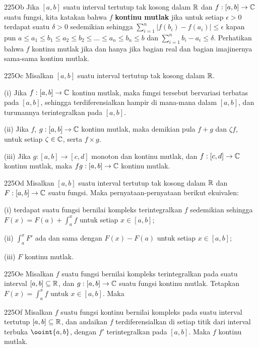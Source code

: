 \spheader 225Ob Jika $[a,b]$ suatu interval tertutup
tak kosong dalam $\Bbb R$ dan $f:[a,b]\to\Bbb C$ suatu fungsi, kita katakan
bahwa $f$ {\bf kontinu mutlak} jika untuk setiap $\epsilon>0$ terdapat
suatu $\delta>0$ sedemikian sehingga $\sum_{i=1}^n|f(b_i)-f(a_i)|\le\epsilon$
kapan pun $a\le a_1\le b_1\le a_2\le b_2\le\ldots\le a_n\le b_n\le b$ dan
$\sum_{i=1}^nb_i-a_i\le\delta$. Perhatikan bahwa $f$ kontinu
mutlak jika dan hanya jika bagian real dan bagian imajinernya sama-sama
kontinu mutlak.

\spheader 225Oc Misalkan $[a,b]$ suatu interval tertutup tak kosong dalam
$\Bbb R$.

\quad(i) Jika $f:[a,b]\to\Bbb C$ kontinu mutlak, maka fungsi tersebut bervariasi
terbatas pada $[a,b]$, sehingga terdiferensialkan hampir di mana-mana dalam $[a,b]$,
dan turunannya terintegralkan pada $[a,b]$.

\quad(ii) Jika $f$, $g:[a,b]\to\Bbb C$ kontinu mutlak, maka demikian pula
$f+g$ dan $\zeta f$, untuk setiap $\zeta\in\Bbb C$, serta $f\times g$.

\quad(iii) Jika $g:[a,b]\to[c,d]$ monoton dan kontinu mutlak,
dan
$f:[c,d]\to\Bbb C$ kontinu mutlak, maka $fg:[a,b]\to\Bbb C$
kontinu mutlak.

\spheader 225Od Misalkan $[a,b]$ suatu interval tertutup tak kosong dalam
$\Bbb R$ dan $F:[a,b]\to\Bbb C$ suatu fungsi. Maka pernyataan-pernyataan berikut
ekuivalen:

\quad(i) terdapat suatu fungsi bernilai kompleks terintegralkan $f$ sedemikian sehingga
$F(x)=F(a)+\int_a^xf$ untuk setiap $x\in[a,b]$;

\quad(ii) $\int_a^xF'$ ada dan sama dengan
$F(x)-F(a)$ untuk setiap $x\in[a,b]$;

\quad(iii) $F$ kontinu mutlak.


\spheader 225Oe Misalkan $f$ suatu fungsi bernilai kompleks terintegralkan
pada suatu interval $[a,b]\subseteq\Bbb R$, dan $g:[a,b]\to\Bbb C$ suatu fungsi
kontinu mutlak. Tetapkan $F(x)=\int_a^xf$ untuk $x\in[a,b]$.
Maka



\spheader 225Of Misalkan $f$ suatu fungsi kontinu bernilai kompleks
pada suatu interval tertutup $[a,b]\subseteq\Bbb R$, dan andaikan $f$
terdiferensialkan di setiap titik dari interval terbuka $\ooint{a,b}$, dengan
$f'$ terintegralkan pada $[a,b]$. Maka $f$ kontinu mutlak.

